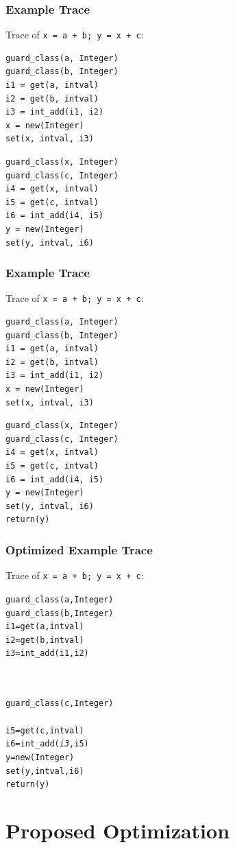 \documentclass[utf8x]{beamer}
\newcommand\redsout[1]{{\color{red}\sout{\hbox{\color{black}{#1}}}}}
\begin{document}
\begin{frame}[containsverbatim]
  \frametitle{Example Trace}
  Trace of \texttt{x = a + b; y = x + c}:
\begin{verbatim}
guard_class(a, Integer)
guard_class(b, Integer)
i1 = get(a, intval)
i2 = get(b, intval)
i3 = int_add(i1, i2)
x = new(Integer)
set(x, intval, i3)
\end{verbatim}
\pause
\begin{verbatim}
guard_class(x, Integer)
guard_class(c, Integer)
i4 = get(x, intval)
i5 = get(c, intval)
i6 = int_add(i4, i5)
y = new(Integer)
set(y, intval, i6)
\end{verbatim}
\end{frame}

\begin{frame}[containsverbatim]
  \frametitle{Example Trace}
  Trace of \texttt{x = a + b; y = x + c}:
\begin{verbatim}
guard_class(a, Integer)
guard_class(b, Integer)
i1 = get(a, intval)
i2 = get(b, intval)
i3 = int_add(i1, i2)
x = new(Integer)
set(x, intval, i3)
\end{verbatim}
\begin{verbatim}
guard_class(x, Integer)
guard_class(c, Integer)
i4 = get(x, intval)
i5 = get(c, intval)
i6 = int_add(i4, i5)
y = new(Integer)
set(y, intval, i6)
return(y)
\end{verbatim}
\end{frame}

\begin{frame}[containsverbatim]
  \frametitle{Optimized Example Trace}
  Trace of \texttt{x = a + b; y = x + c}:
\begin{alltt}
guard_class(a, Integer)
guard_class(b, Integer)
i1 = get(a, intval)
i2 = get(b, intval)
i3 = int_add(i1, i2)
\redsout{x = new(Integer)}
\redsout{set(x, intval, i3)}
\end{alltt}
\begin{alltt}
\redsout{guard_class(x, Integer)}
guard_class(c, Integer)
\redsout{i4 = get(x, intval)}
i5 = get(c, intval)
i6 = int_add(\emph{i3}, i5)
y = new(Integer)
set(y, intval, i6)
return(y)
\end{alltt}
\end{frame}

\section{Proposed Optimization}
\end{document}
